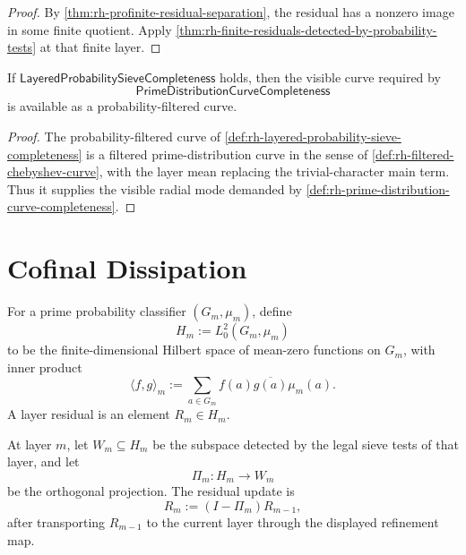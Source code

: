 \begin{proof}
By \autoref{thm:rh-profinite-residual-separation}, the residual has a
nonzero image in some finite quotient.  Apply
\autoref{thm:rh-finite-residuals-detected-by-probability-tests} at that
finite layer.
\end{proof}

\begin{theorem}
\label{thm:rh-layered-probability-supplies-distribution-curve-completeness}
If $\mathsf{LayeredProbabilitySieveCompleteness}$ holds, then the
visible curve required by
$$
\mathsf{PrimeDistributionCurveCompleteness}
$$
is available as a probability-filtered curve.
\end{theorem}

\begin{proof}
The probability-filtered curve of
\autoref{def:rh-layered-probability-sieve-completeness} is a filtered
prime-distribution curve in the sense of
\autoref{def:rh-filtered-chebyshev-curve}, with the layer mean replacing
the trivial-character main term.  Thus it supplies the visible radial
mode demanded by
\autoref{def:rh-prime-distribution-curve-completeness}.
\end{proof}

\section{Cofinal Dissipation}
\label{sec:rh-layered-prime-probability-cofinal-dissipation}

\begin{definition}
\label{def:rh-layer-residual-hilbert-space}
For a prime probability classifier $(G_m,\mu_m)$, define
$$
H_m:=L^2_0(G_m,\mu_m)
$$
to be the finite-dimensional Hilbert space of mean-zero functions on
$G_m$, with inner product
$$
\langle f,g\rangle_m
:=
\sum_{a\in G_m}f(a)\overline{g(a)}\mu_m(a).
$$
A layer residual is an element $R_m\in H_m$.
\end{definition}

\begin{definition}
\label{def:rh-detected-subspace-residual-update}
At layer $m$, let $W_m\subseteq H_m$ be the subspace detected by the
legal sieve tests of that layer, and let
$$
\Pi_m:H_m\to W_m
$$
be the orthogonal projection.  The residual update is
$$
R_m:=(I-\Pi_m)R_{m-1},
$$
after transporting $R_{m-1}$ to the current layer through the displayed
refinement map.
\end{definition}

